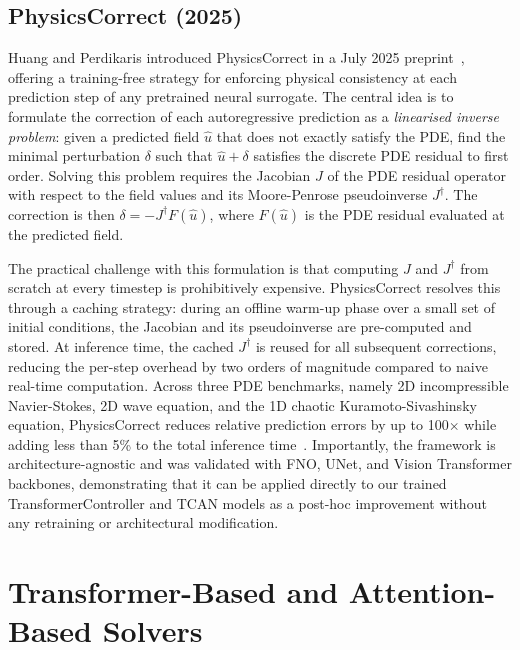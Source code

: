 \subsection{PhysicsCorrect (2025)}
\label{sec:bg:physicscorrect}

Huang and Perdikaris introduced PhysicsCorrect in a July 2025 preprint~\cite{huang2025physicscorrect}, offering a training-free strategy for enforcing physical consistency at each prediction step of any pretrained neural surrogate. The central idea is to formulate the correction of each autoregressive prediction as a \emph{linearised inverse problem}: given a predicted field $\hat{u}$ that does not exactly satisfy the PDE, find the minimal perturbation $\delta$ such that $\hat{u} + \delta$ satisfies the discrete PDE residual to first order. Solving this problem requires the Jacobian $J$ of the PDE residual operator with respect to the field values and its Moore-Penrose pseudoinverse $J^\dagger$. The correction is then $\delta = -J^\dagger F(\hat{u})$, where $F(\hat{u})$ is the PDE residual evaluated at the predicted field.

The practical challenge with this formulation is that computing $J$ and $J^\dagger$ from scratch at every timestep is prohibitively expensive. PhysicsCorrect resolves this through a caching strategy: during an offline warm-up phase over a small set of initial conditions, the Jacobian and its pseudoinverse are pre-computed and stored. At inference time, the cached $J^\dagger$ is reused for all subsequent corrections, reducing the per-step overhead by two orders of magnitude compared to naive real-time computation. Across three PDE benchmarks, namely 2D incompressible Navier-Stokes, 2D wave equation, and the 1D chaotic Kuramoto-Sivashinsky equation, PhysicsCorrect reduces relative prediction errors by up to 100$\times$ while adding less than 5\% to the total inference time~\cite{huang2025physicscorrect}. Importantly, the framework is architecture-agnostic and was validated with FNO, UNet, and Vision Transformer backbones, demonstrating that it can be applied directly to our trained TransformerController and TCAN models as a post-hoc improvement without any retraining or architectural modification.

\section{Transformer-Based and Attention-Based Solvers}
\label{sec:bg:transformers}

